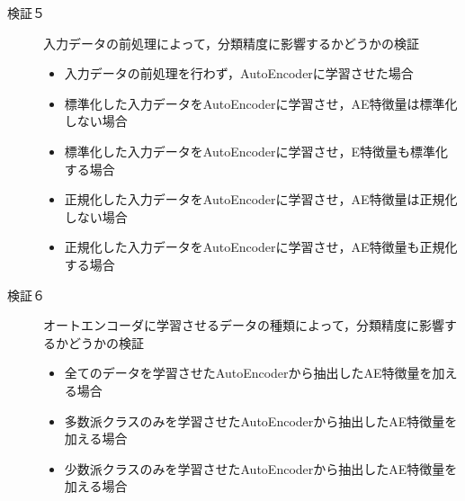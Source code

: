 \begin{description}
    \item [検証５] 入力データの前処理によって，分類精度に影響するかどうかの検証
    \begin{itemize}
        \item 入力データの前処理を行わず，AutoEncoderに学習させた場合
        \item 標準化した入力データをAutoEncoderに学習させ，AE特徴量は標準化しない場合
        \item 標準化した入力データをAutoEncoderに学習させ，E特徴量も標準化する場合
        \item 正規化した入力データをAutoEncoderに学習させ，AE特徴量は正規化しない場合
        \item 正規化した入力データをAutoEncoderに学習させ，AE特徴量も正規化する場合
    \end{itemize}

    \item [検証６] オートエンコーダに学習させるデータの種類によって，分類精度に影響するかどうかの検証
    \begin{itemize}
        \item 全てのデータを学習させたAutoEncoderから抽出したAE特徴量を加える場合
        \item 多数派クラスのみを学習させたAutoEncoderから抽出したAE特徴量を加える場合
        \item 少数派クラスのみを学習させたAutoEncoderから抽出したAE特徴量を加える場合
    \end{itemize}

    

\end{description}